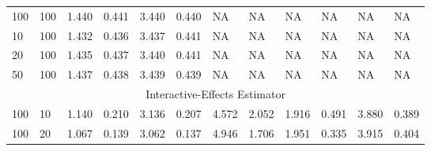 \documentclass[a4paper]{article}
\begin{document}
\begin{table}[]
\begin{threeparttable}
\begin{tabular}{llllllllllll}
100 & 100 & 1.440                                                             & 0.441 & 3.440                                                             & 0.440 & NA                                                            & NA    & NA                                                               & NA    & NA                                                               & NA    \\
10  & 100 & 1.432                                                             & 0.436 & 3.437                                                             & 0.441 & NA                                                            & NA    & NA                                                               & NA    & NA                                                               & NA    \\
20  & 100 & 1.435                                                             & 0.437 & 3.440                                                             & 0.441 & NA                                                            & NA    & NA                                                               & NA    & NA                                                               & NA    \\
50  & 100 & 1.437                                                             & 0.438 & 3.439                                                             & 0.439 & NA                                                            & NA    & NA                                                               & NA    & NA                                                               & NA    \\
\multicolumn{12}{c}{Interactive-Effects   Estimator}                                                                                                                                                                                                                                                                                                                                            \\
100 & 10  & 1.140                                                             & 0.210 & 3.136                                                             & 0.207 & 4.572                                                         & 2.052 & 1.916                                                            & 0.491 & 3.880                                                            & 0.389 \\
100 & 20  & 1.067                                                             & 0.139 & 3.062                                                             & 0.137 & 4.946                                                         & 1.706 & 1.951                                                            & 0.335 & 3.915                                                            & 0.404 \\

\end{tabular}
\end{threeparttable}
\end{table}
\end{document}
